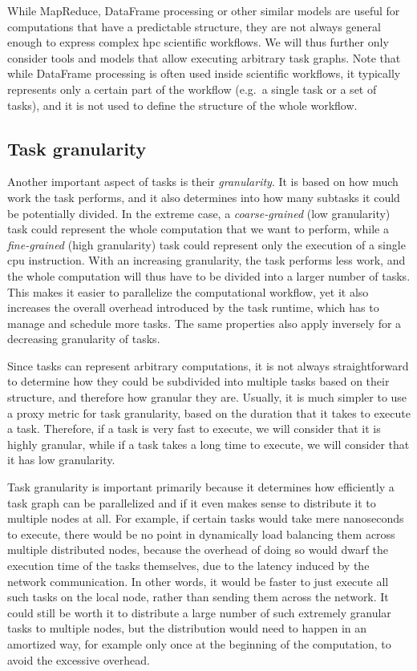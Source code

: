 While MapReduce, DataFrame processing or other similar models are useful for computations that have
a predictable structure, they are not always general enough to express complex
\gls{hpc} scientific workflows. We will thus further only consider tools and models
that allow executing arbitrary task graphs. Note that while DataFrame processing is often used
inside scientific workflows, it typically represents only a certain part of the workflow (e.g.\
a single task or a set of tasks), and it is not used to define the structure of the whole workflow.

\subsection{Task granularity}
\label{sec:task-granularity}
Another important aspect of tasks is their \emph{granularity}. It is based on how much work
the task performs, and it also determines into how many subtasks it could be potentially divided.
In the extreme case, a \emph{coarse-grained} (low granularity) task could represent the whole computation that we
want to perform, while a \emph{fine-grained} (high granularity) task could represent only the execution of a
single \gls{cpu} instruction. With an increasing granularity, the task performs less
work, and the whole computation will thus have to be divided into a larger number of tasks. This
makes it easier to parallelize the computational workflow, yet it also increases the overall
overhead introduced by the task runtime, which has to manage and schedule more tasks. The same
properties also apply inversely for a decreasing granularity of tasks.

Since tasks can represent arbitrary computations, it is not always straightforward to determine how
they could be subdivided into multiple tasks based on their structure, and therefore how granular
they are. Usually, it is much simpler to use a proxy metric for task granularity, based on the
duration that it takes to execute a task. Therefore, if a task is very fast to execute, we will
consider that it is highly granular, while if a task takes a long time to execute, we will consider
that it has low granularity.

Task granularity is important primarily because it determines how efficiently a task graph can be
parallelized and if it even makes sense to distribute it to multiple nodes at all. For example, if
certain tasks would take mere nanoseconds to execute, there would be no point in dynamically load
balancing them across multiple distributed nodes, because the overhead of doing so would dwarf the
execution time of the tasks themselves, due to the latency induced by the network communication. In
other words, it would be faster to just execute all such tasks on the local node, rather than
sending them across the network. It could still be worth it to distribute a large number of such
extremely granular tasks to multiple nodes, but the distribution would need to happen in an
amortized way, for example only once at the beginning of the computation, to avoid the excessive
overhead.

